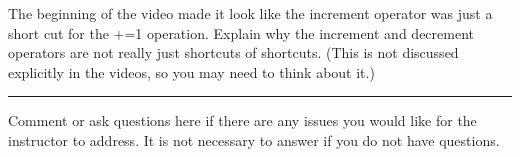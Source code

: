 \documentclass[letterpaper,12pt]{exam}
\begin{document}
\begin{questions}
\begin{samepage}
    \question The beginning of the video made it look like the increment operator was just a short cut for the +=1 operation.  Explain why the increment and decrement operators are not really just shortcuts of shortcuts.  (This is not discussed explicitly in the videos, so you may need to think about it.)
    \vspace{5mm}
\end{samepage}


\begin{samepage}
    \begin{center}
    \rule{0.8\textwidth}{.4pt}
    \end{center}
	\question Comment or ask questions here if there are any issues you would like for the instructor to address.  It is not necessary to answer if you do not have questions.
	\vspace{30mm}
\end{samepage}

\end{questions}
\end{document}
